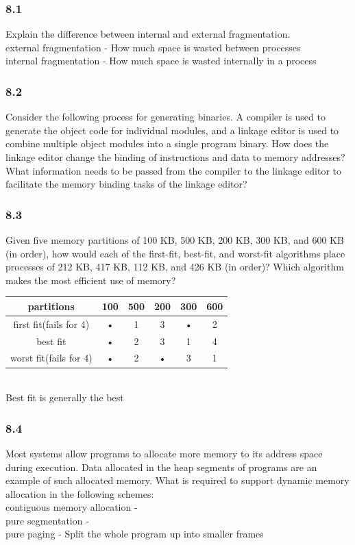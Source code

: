 \documentclass[a4paper,10pt,titlepage]{report}
\begin{document}
\subsubsection{8.1}
 Explain the difference between internal and external fragmentation. \\
external fragmentation - How much space is wasted between processes \\

internal fragmentation - How much space is wasted internally in a process \\

\subsubsection{8.2}
Consider the following process for generating binaries. A compiler is used to generate the object code for individual modules, and a linkage editor is used to combine multiple object modules into a single program binary. How does the linkage editor change the binding of instructions and data to memory addresses? What information needs to be passed from the compiler to the linkage editor to facilitate the memory binding tasks of the linkage editor? \\

\subsubsection{8.3}
Given five memory partitions of 100 KB, 500 KB, 200 KB, 300 KB, and 600 KB (in order), how would each of the first-fit, best-fit, and worst-fit algorithms place processes of 212 KB, 417 KB, 112 KB, and 426 KB (in order)? Which algorithm makes the most efficient use of memory? \\
\begin{tabular}{|c|c|c|c|c|c|}
\hline 
partitions & 100 & 500 & 200 & 300 & 600 \\ 
\hline 
first fit(fails for 4) & • & 1 & 3 & • & 2 \\ 
\hline 
best fit  & • & 2 & 3 & 1 & 4 \\ 
\hline 
worst fit(fails for 4) & • & 2 & • & 3 & 1 \\ 
\hline 
\end{tabular} 
\\
Best fit is generally the best \\
\subsubsection{8.4}
Most systems allow programs to allocate more memory to its address space during execution. Data allocated in the heap segments of programs are an example of such allocated memory. What is required to support dynamic memory allocation in the following schemes:
\\
\hspace{10mm}   contiguous memory allocation - \\
\hspace{10mm}	pure segmentation - \\
\hspace{10mm}	pure paging - Split the whole program up into smaller frames\\
\end{document}
